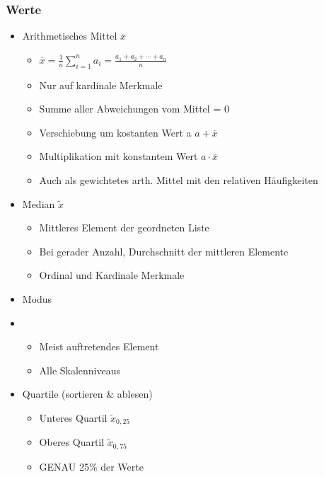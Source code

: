 \documentclass[a4paper]{article}
\begin{document}
\begin{landscape}
\begin{multicols}{4}
    \subsubsection*{Werte}
    \begin{itemize}[noitemsep,nolistsep,leftmargin=*]
        \item Arithmetisches Mittel $\overline{x}$
        \begin{itemize}[noitemsep,nolistsep,leftmargin=*]
            \item $\overline{x}=\frac{1}{n}\sum _{i=1}^{n}a_{i}={\frac {a_{1}+a_{2}+\cdots +a_{n}}{n}}$ 
            \item Nur auf kardinale Merkmale
            \item Summe aller Abweichungen vom Mittel = 0
            \item Verschiebung um kostanten Wert a $a + \overline{x}$
            \item Multiplikation mit konstantem Wert $a \cdot \overline{x}$
            \item Auch als gewichtetes arth. Mittel mit den relativen Häufigkeiten
        \end{itemize}
        \item Median $\widetilde{x}$
        \begin{itemize}[noitemsep,nolistsep,leftmargin=*]
            \item Mittleres Element der geordneten Liste
            \item Bei gerader Anzahl, Durchschnitt der mittleren Elemente
            \item Ordinal und Kardinale Merkmale
        \end{itemize}
        \item Modus 
        \item \begin{itemize}[noitemsep,nolistsep,leftmargin=*]
            \item Meist auftretendes Element
            \item Alle Skalenniveaus
        \end{itemize}
        \item Quartile (sortieren \& ablesen)
        \begin{itemize}[noitemsep,nolistsep,leftmargin=*]
            \item Unteres Quartil $\widetilde{x}_{0,25}$ 
            \item Oberes Quartil $\widetilde{x}_{0,75}$
            \item GENAU 25\% der Werte

\end{itemize}
\end{itemize}
\end{multicols}
\end{landscape}
\end{document}
